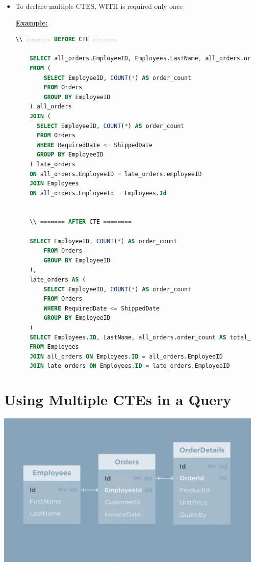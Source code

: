 \documentclass[12pt]{article}
\begin{document}
\begin{itemize}
    \item To declare multiple CTES, WITH is required only once

    \bigskip

    \underline{\textbf{Example:}}

    \bigskip

    \begin{lstlisting}[language=SQL]
    \\ ======= BEFORE CTE =======

    SELECT all_orders.EmployeeID, Employees.LastName, all_orders.order_count AS total_order_count, late_orders.order_count AS late_order_count
    FROM (
        SELECT EmployeeID, COUNT(*) AS order_count
        FROM Orders
        GROUP BY EmployeeID
    ) all_orders
    JOIN (
      SELECT EmployeeID, COUNT(*) AS order_count
      FROM Orders
      WHERE RequiredDate <= ShippedDate
      GROUP BY EmployeeID
    ) late_orders
    ON all_orders.EmployeeID = late_orders.employeeID
    JOIN Employees
    ON all_orders.EmployeeId = Employees.Id


    \\ ======= AFTER CTE ========

    SELECT EmployeeID, COUNT(*) AS order_count
        FROM Orders
        GROUP BY EmployeeID
    ),
    late_orders AS (
        SELECT EmployeeID, COUNT(*) AS order_count
        FROM Orders
        WHERE RequiredDate <= ShippedDate
        GROUP BY EmployeeID
    )
    SELECT Employees.ID, LastName, all_orders.order_count AS total_order_count, late_orders.order_count AS late_order_count
    FROM Employees
    JOIN all_orders ON Employees.ID = all_orders.EmployeeID
    JOIN late_orders ON Employees.ID = late_orders.EmployeeID
    \end{lstlisting}
\end{itemize}


\bigskip

\section{Using Multiple CTEs in a Query}

\bigskip

\begin{center}
\includegraphics[width=\linewidth]{images/part_1_notes_1.png}
\end{center}
\end{document}
